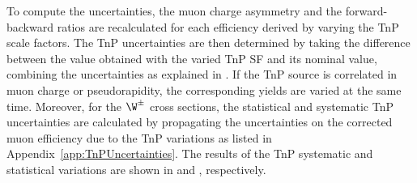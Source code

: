 To compute the uncertainties, the muon charge asymmetry and the forward-backward ratios are recalculated for each efficiency derived by varying the TnP scale factors. The TnP uncertainties are then determined by taking the difference between the value obtained with the varied TnP SF and its nominal value, combining the uncertainties as explained in . If the TnP source is correlated in muon charge or pseudorapidity, the corresponding \W yields are varied at the same time. Moreover, for the $\W^{\pm}$ cross sections, the statistical and systematic TnP uncertainties are calculated by propagating the uncertainties on the corrected muon efficiency due to the TnP variations as listed in Appendix~\ref{app:TnPUncertainties}. The results of the TnP systematic and statistical variations are shown in  and , respectively.


